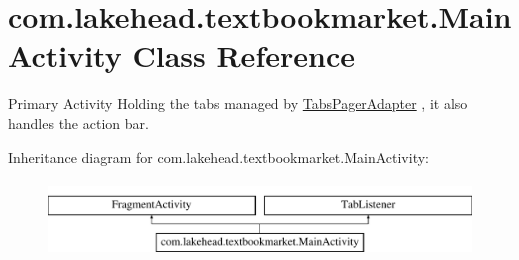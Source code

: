 \hypertarget{classcom_1_1lakehead_1_1textbookmarket_1_1_main_activity}{\section{com.\-lakehead.\-textbookmarket.\-Main\-Activity Class Reference}
\label{classcom_1_1lakehead_1_1textbookmarket_1_1_main_activity}
}


Primary Activity Holding the tabs managed by \hyperlink{classcom_1_1lakehead_1_1textbookmarket_1_1_tabs_pager_adapter}{Tabs\-Pager\-Adapter} , it also handles the action bar.  


Inheritance diagram for com.\-lakehead.\-textbookmarket.\-Main\-Activity\-:\begin{figure}[H]
\begin{center}
\leavevmode
\includegraphics[height=2.000000cm]{classcom_1_1lakehead_1_1textbookmarket_1_1_main_activity}
\end{center}
\end{figure}
